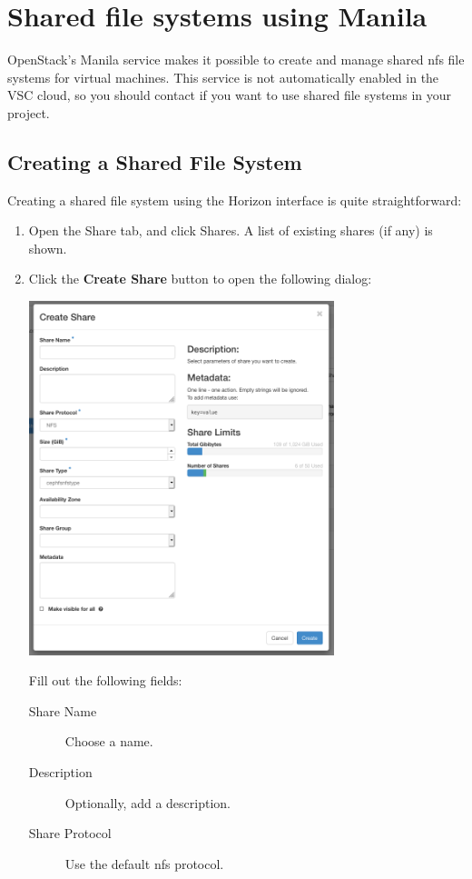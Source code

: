 \chapter{Shared file systems using Manila}\label{cha:shared-file-systems}
OpenStack's Manila service makes it possible to create and manage
shared \gls{nfs} file systems for virtual machines.  This service is
not automatically enabled in the VSC cloud, so you should contact
\cloudinfo if you want to use shared file systems in your project.

\section*{Creating a Shared File System}\label{sec:creating-shared-file}
Creating a shared file system using the Horizon interface is quite straightforward:
\begin{enumerate}
\item Open the Share tab, and click Shares.  A list of existing shares (if any) is shown.
\item Click the \textbf{Create Share} button to open the following dialog:
  \begin{center}
    \includegraphics[width=0.7\textwidth]{img/create_share}
  \end{center}
  Fill out the following fields:
  \begin{description}
  \item[Share Name] Choose a name.
  \item[Description] Optionally, add a description.
  \item[Share Protocol] Use the default \gls{nfs} protocol.

\end{description}
\end{enumerate}
